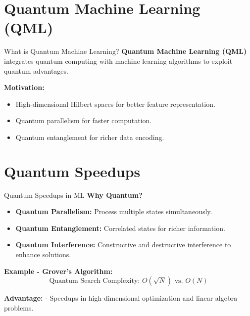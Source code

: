 \documentclass{beamer}
\begin{document}
\section{Quantum Machine Learning (QML)}
\begin{frame}{What is Quantum Machine Learning?}
\textbf{Quantum Machine Learning (QML)} integrates quantum computing with machine learning algorithms to exploit quantum advantages.

\vspace{10pt}
\textbf{Motivation:}
\begin{itemize}
    \item High-dimensional Hilbert spaces for better feature representation.
    \item Quantum parallelism for faster computation.
    \item Quantum entanglement for richer data encoding.
\end{itemize}


\end{frame}

\section{Quantum Speedups}
\begin{frame}{Quantum Speedups in ML}
\textbf{Why Quantum?}
\begin{itemize}
    \item \textbf{Quantum Parallelism:} Process multiple states simultaneously.
    \item \textbf{Quantum Entanglement:} Correlated states for richer information.
    \item \textbf{Quantum Interference:} Constructive and destructive interference to enhance solutions.
\end{itemize}

\textbf{Example - Grover's Algorithm:}
\[
\text{Quantum Search Complexity: } O(\sqrt{N}) \text{ vs. } O(N)
\]

\textbf{Advantage:}
- Speedups in high-dimensional optimization and linear algebra problems.
\end{frame}

\end{document}
